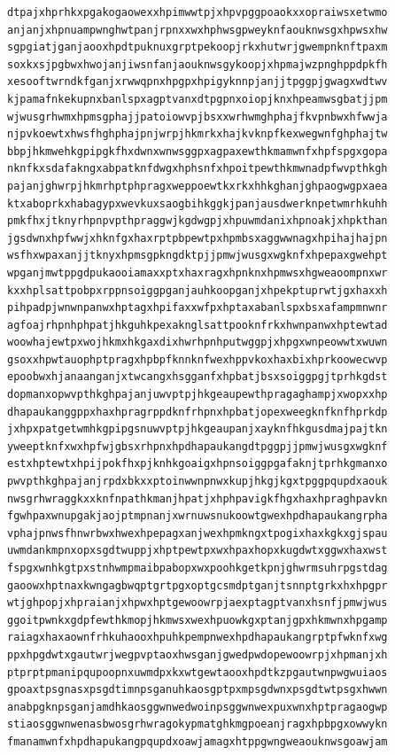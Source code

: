 \documentclass[11pt,letterpaper]{exam}
\begin{document}
\begin{questions}
\begin{verbatim}
dtpajxhprhkxpgakogaowexxhpimwwtpjxhpvpggpoaokxxopraiwsxetwmo
anjanjxhpnuampwnghwtpanjrpnxxwxhphwsgpweyknfaouknwsgxhpwsxhw
sgpgiatjganjaooxhpdtpuknuxgrptpekoopjrkxhutwrjgwempnknftpaxm
soxkxsjpgbwxhwojanjiwsnfanjaouknwsgykoopjxhpmajwzpnghppdpkfh
xesooftwrndkfganjxrwwqpnxhpgpxhpigyknnpjanjjtpggpjgwagxwdtwv
kjpamafnkekupnxbanlspxagptvanxdtpgpnxoiopjknxhpeamwsgbatjjpm
wjwusgrhwmxhpmsgphajjpatoiowvpjbsxxwrhwmghphajfkvpnbwxhfwwja
njpvkoewtxhwsfhghphajpnjwrpjhkmrkxhajkvknpfkexwegwnfghphajtw
bbpjhkmwehkgpipgkfhxdwnxwnwsggpxagpaxewthkmamwnfxhpfspgxgopa
nknfkxsdafakngxabpatknfdwgxhphsnfxhpoitpewthkmwnadpfwvpthkgh
pajanjghwrpjhkmrhptphpragxweppoewtkxrkxhhkghanjghpaogwgpxaea
ktxaboprkxhabagypxwevkuxsaogbihkggkjpanjausdwerknpetwmrhkuhh
pmkfhxjtknyrhpnpvpthpraggwjkgdwgpjxhpuwmdanixhpnoakjxhpkthan
jgsdwnxhpfwwjxhknfgxhaxrptpbpewtpxhpmbsxaggwwnagxhpihajhajpn
wsfhxwpaxanjjtknyxhpmsgpkngdktpjjpmwjwusgxwgknfxhpepaxgwehpt
wpganjmwtppgdpukaooiamaxxptxhaxragxhpnknxhpmwsxhgweaoompnxwr
kxxhplsattpobpxrppnsoiggpganjauhkoopganjxhpekptuprwtjgxhaxxh
pihpadpjwnwnpanwxhptagxhpifaxxwfpxhptaxabanlspxbsxafampmnwnr
agfoajrhpnhphpatjhkguhkpexaknglsattpooknfrkxhwnpanwxhptewtad
woowhajewtpxwojhkmxhkgaxdixhwrhpnhputwggpjxhpgxwnpeowwtxwuwn
gsoxxhpwtauophptpragxhpbpfknnknfwexhppvkoxhaxbixhprkoowecwvp
epoobwxhjanaanganjxtwcangxhsgganfxhpbatjbsxsoiggpgjtprhkgdst
dopmanxopwvpthkghpajanjuwvptpjhkgeaupewthpragaghampjxwopxxhp
dhapaukanggppxhaxhpragrppdknfrhpnxhpbatjopexweegknfknfhprkdp
jxhpxpatgetwmhkgpipgsnuwvptpjhkgeaupanjxayknfhkgusdmajpajtkn
yweeptknfxwxhpfwjgbsxrhpnxhpdhapaukangdtpggpjjpmwjwusgxwgknf
estxhptewtxhpijpokfhxpjknhkgoaigxhpnsoiggpgafaknjtprhkgmanxo
pwvpthkghpajanjrpdxbkxxptoinwwnpnwxkupjhkgjkgxtpggpqupdxaouk
nwsgrhwraggkxxknfnpathkmanjhpatjxhphpavigkfhgxhaxhpraghpavkn
fgwhpaxwnupgakjaojptmpnanjxwrnuwsnukoowtgwexhpdhapaukangrpha
vphajpnwsfhnwrbwxhwexhpepagxanjwexhpmkngxtpogixhaxkgkxgjspau
uwmdankmpnxopxsgdtwuppjxhptpewtpxwxhpaxhopxkugdwtxggwxhaxwst
fspgxwnhkgtpxstnhwmpmaibpabopxwxpoohkgetkpnjghwrmsuhrpgstdag
gaoowxhptnaxkwngagbwqptgrtpgxoptgcsmdptganjtsnnptgrkxhxhpgpr
wtjghpopjxhpraianjxhpwxhptgewoowrpjaexptagptvanxhsnfjpmwjwus
ggoitpwnkxgdpfewthkmopjhkmwsxwexhpuowkgxptanjgpxhkmwnxhpgamp
raiagxhaxaownfrhkuhaooxhpuhkpempnwexhpdhapaukangrptpfwknfxwg
ppxhpgdwtxgautwrjwegpvptaoxhwsganjgwedpwdopewoowrpjxhpmanjxh
ptprptpmanipqupoopnxuwmdpxkxwtgewtaooxhpdtkzpgautwnpwgwuiaos
gpoaxtpsgnasxpsgdtimnpsganuhkaosgptpxmpsgdwnxpsgdtwtpsgxhwwn
anabpgknpsganjamdhkaosggwnwedwoinpsggwnwexpuxwnxhptpragaogwp
stiaosggwnwenasbwosgrhwragokypmatghkmgpoeanjragxhpbpgxowwykn
fmanamwnfxhpdhapukangpqupdxoawjamagxhtppgwngweaouknwsgoawjam

\end{verbatim}
\end{questions}
\end{document}
